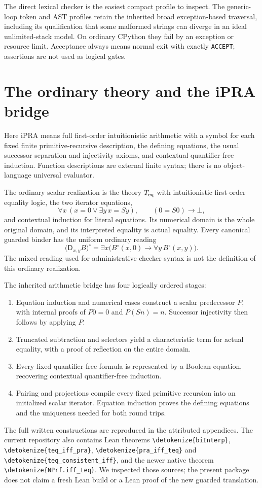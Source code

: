 \documentclass[11pt,letterpaper]{article}
\theoremstyle{definition}\newtheorem{definition}[theorem]{Definition}
\theoremstyle{remark}\newtheorem{remark}[theorem]{Remark}
\newcommand{\D}{\mathsf D}
\newcommand{\file}[1]{\expandafter\nolinkurl\expandafter{\detokenize{#1}}}
\begin{document}
The direct lexical checker is the easiest compact profile to inspect.
The generic-loop token and AST profiles retain the inherited broad
exception-based traversal, including its qualification that some
malformed strings can diverge in an ideal unlimited-stack model. On
ordinary CPython they fail by an exception or resource limit. Acceptance
always means normal exit with exactly \texttt{ACCEPT}; assertions are
not used as logical gates.



\section{The ordinary theory and the iPRA bridge}
\label{sec:bridge-summary}
Here iPRA means full first-order intuitionistic arithmetic with a symbol
for each fixed finite primitive-recursive description, the defining
equations, the usual successor separation and injectivity axioms, and
contextual quantifier-free induction. Function descriptions are external
finite syntax; there is no object-language universal evaluator.

The ordinary scalar realization is the theory \(T_{\rm eq}\) with
intuitionistic first-order equality logic, the two iterator equations,
\[
 \forall x\,(x=0\vee\exists y\,x=Sy),\qquad
 (0=S0)\to\bot,
\]
and contextual induction for literal equations. Its numerical domain is
the whole original domain, and its interpreted equality is actual
equality. Every canonical guarded binder has the uniform ordinary
reading
\[
 \bigl(\D_{x,y}B\bigr)^\circ
      =\exists x\bigl(B^\circ(x,0)\to\forall y\,B^\circ(x,y)\bigr).
\]
The mixed reading used for administrative checker syntax is not the
definition of this ordinary realization.

The inherited arithmetic bridge has four logically ordered stages:
\begin{enumerate}
\item Equation induction and numerical cases construct a scalar
predecessor \(P\), with internal proofs of \(P0=0\) and \(P(Sn)=n\).
Successor injectivity then follows by applying \(P\).
\item Truncated subtraction and selectors yield a characteristic term
for actual equality, with a proof of reflection on the entire domain.
\item Every fixed quantifier-free formula is represented by a Boolean
equation, recovering contextual quantifier-free induction.
\item Pairing and projections compile every fixed primitive recursion
into an initialized scalar iterator. Equation induction proves the
defining equations and the uniqueness needed for both round trips.
\end{enumerate}
The full written constructions are reproduced in the attributed
appendices. The current repository also contains Lean theorems
\file{biInterp}, \file{teq_iff_pra}, \file{pra_iff_teq} and
\file{teq_consistent_iff}, and the newer native theorem
\file{NPrf.iff_teq}. We inspected those sources; the present package does
not claim a fresh Lean build or a Lean proof of the new guarded
translation.\cite{lean-bi,lean-native}
\end{document}
